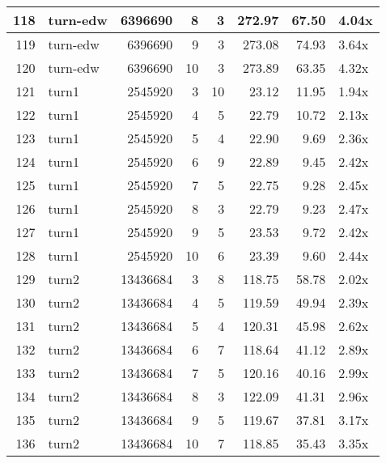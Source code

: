 \begin{table}[ht]
\begin{tabular}{rlrrrrrl}
   \hline
118 & turn-edw & 6396690 &   8 &   3 & 272.97 & 67.50 & 4.04x \\ 
   \hline
119 & turn-edw & 6396690 &   9 &   3 & 273.08 & 74.93 & 3.64x \\ 
   \hline
120 & turn-edw & 6396690 &  10 &   3 & 273.89 & 63.35 & 4.32x \\ 
   \hline
121 & turn1 & 2545920 &   3 &  10 & 23.12 & 11.95 & 1.94x \\ 
   \hline
122 & turn1 & 2545920 &   4 &   5 & 22.79 & 10.72 & 2.13x \\ 
   \hline
123 & turn1 & 2545920 &   5 &   4 & 22.90 & 9.69 & 2.36x \\ 
   \hline
124 & turn1 & 2545920 &   6 &   9 & 22.89 & 9.45 & 2.42x \\ 
   \hline
125 & turn1 & 2545920 &   7 &   5 & 22.75 & 9.28 & 2.45x \\ 
   \hline
126 & turn1 & 2545920 &   8 &   3 & 22.79 & 9.23 & 2.47x \\ 
   \hline
127 & turn1 & 2545920 &   9 &   5 & 23.53 & 9.72 & 2.42x \\ 
   \hline
128 & turn1 & 2545920 &  10 &   6 & 23.39 & 9.60 & 2.44x \\ 
   \hline
129 & turn2 & 13436684 &   3 &   8 & 118.75 & 58.78 & 2.02x \\ 
   \hline
130 & turn2 & 13436684 &   4 &   5 & 119.59 & 49.94 & 2.39x \\ 
   \hline
131 & turn2 & 13436684 &   5 &   4 & 120.31 & 45.98 & 2.62x \\ 
   \hline
132 & turn2 & 13436684 &   6 &   7 & 118.64 & 41.12 & 2.89x \\ 
   \hline
133 & turn2 & 13436684 &   7 &   5 & 120.16 & 40.16 & 2.99x \\ 
   \hline
134 & turn2 & 13436684 &   8 &   3 & 122.09 & 41.31 & 2.96x \\ 
   \hline
135 & turn2 & 13436684 &   9 &   5 & 119.67 & 37.81 & 3.17x \\ 
   \hline
136 & turn2 & 13436684 &  10 &   7 & 118.85 & 35.43 & 3.35x \\ 
   \hline
\end{tabular}
\end{table}
